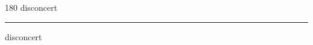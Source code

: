 
\begin{frame}
\begin{center}
\begin{turn}{180}
{\fontsize{2.5cm}{1em}\selectfont disconcert}
\end{turn}
\vspace{1em}\par  
\hrule
\vspace{1em}\par  
{\fontsize{2.5cm}{1em}\selectfont disconcert}
\end{center}
\end{frame}
